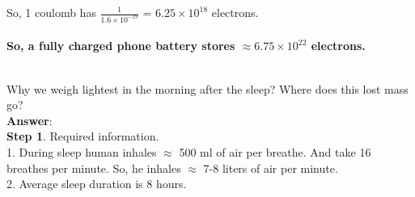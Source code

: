 \documentclass[11pt]{exam}
\begin{document}
\begin{questions}
 So, 1 coulomb has $\frac{1}{1.6 \times10^{-19}}$ = $6.25 \times 10^{18}$ electrons. \\   
                                               
 \\ 

\textbf{So, a fully charged phone battery stores $\approx 6.75 \times 10^{22}$ electrons.}\\ \\

%
%
                

\question
\label{Q9:Lightest morning}

Why we weigh lightest in the morning after the sleep? Where does this lost mass go? \\
\textbf{Answer}: \\
\textbf{Step 1}. Required information.\\
               1. During sleep human inhales $\approx$ 500 ml of air per breathe. And take 16 breathes per minute. So, he inhales $\approx$ 7-8 liters of air per minute. \\
               2. Average sleep duration is 8 hours.  \\ 
               

\end{questions}
\end{document}
